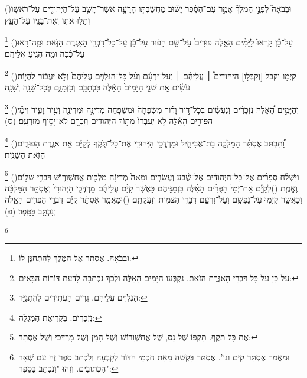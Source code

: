 \documentclass[12pt, openany]{book}
\newcommand{\footnotecomment}[1]{
	\renewcommand\thefootnote{}
	\footnote{#1}}
\newcommand{\commenta}[1]{\footnotecomment{#1}\hspace{0em}}
\newcommand{\vsnum}[1]{(\hebrewnumeral{#1})\space}
\begin{document}
{\vsnum{25}וּבְבֹאָהּ֮ לִפְנֵ֣י הַמֶּלֶךְ֒ אָמַ֣ר עִם־הַסֵּ֔פֶר יָשׁ֞וּב מַחֲשַׁבְתּ֧וֹ הָרָעָ֛ה אֲשֶׁר־חָשַׁ֥ב עַל־הַיְּהוּדִ֖ים עַל־רֹאשׁ֑וֹ וְתָל֥וּ אֹת֛וֹ וְאֶת־בָּנָ֖יו עַל־הָעֵֽץ׃%
\commenta{וּבְבֹאָהּ. אֶסְתֵּר אֶל הַמֶּלֶךְ לְהִתְחַנֶּן לוֹ:}%
\vsnum{26}עַל־כֵּ֡ן קָֽרְאוּ֩ לַיָּמִ֨ים הָאֵ֤לֶּה פוּרִים֙ עַל־שֵׁ֣ם הַפּ֔וּר עַל־כֵּ֕ן עַל־כָּל־דִּבְרֵ֖י הָאִגֶּ֣רֶת הַזֹּ֑את וּמָֽה־רָא֣וּ עַל־כָּ֔כָה וּמָ֥ה הִגִּ֖יעַ אֲלֵיהֶֽם׃%
\commenta{עַל כֵּן עַל כָּל דִּבְרֵי הָאִגֶּרֶת הַזֹּאת. נִקְבְּעוּ הַיָּמִים הָאֵלֶּה וּלְכַךְ נִכְתְּבָה לָדַעַת דּוֹרוֹת הַבָּאִים:}%
\vsnum{27}קִיְּמ֣וּ וקבל [וְקִבְּל֣וּ] הַיְּהוּדִים֩ ׀ עֲלֵיהֶ֨ם ׀ וְעַל־זַרְעָ֜ם וְעַ֨ל כָּל־הַנִּלְוִ֤ים עֲלֵיהֶם֙ וְלֹ֣א יַעֲב֔וֹר לִהְי֣וֹת עֹשִׂ֗ים אֵ֣ת שְׁנֵ֤י הַיָּמִים֙ הָאֵ֔לֶּה כִּכְתָבָ֖ם וְכִזְמַנָּ֑ם בְּכָל־שָׁנָ֖ה וְשָׁנָֽה׃%
\commenta{הַנִּלְוִים עֲלֵיהֶם. גֵּרִים הָעֲתִידִים לְהִתְגַּיֵּר:}%
\vsnum{28}וְהַיָּמִ֣ים הָ֠אֵלֶּה נִזְכָּרִ֨ים וְנַעֲשִׂ֜ים בְּכָל־דּ֣וֹר וָד֗וֹר מִשְׁפָּחָה֙ וּמִשְׁפָּחָ֔ה מְדִינָ֥ה וּמְדִינָ֖ה וְעִ֣יר וָעִ֑יר וִימֵ֞י הַפּוּרִ֣ים הָאֵ֗לֶּה לֹ֤א יַֽעַבְרוּ֙ מִתּ֣וֹךְ הַיְּהוּדִ֔ים וְזִכְרָ֖ם לֹא־יָס֥וּף מִזַּרְעָֽם׃ (ס)%
\commenta{נִזְכָּרִים. בִּקְרִיאַת הַמְּגִלָּה:}%
\vsnum{29}וַ֠תִּכְתֹּב אֶסְתֵּ֨ר הַמַּלְכָּ֧ה בַת־אֲבִיחַ֛יִל וּמָרְדֳּכַ֥י הַיְּהוּדִ֖י אֶת־כָּל־תֹּ֑קֶף לְקַיֵּ֗ם אֵ֣ת אִגֶּ֧רֶת הַפּוּרִ֛ים הַזֹּ֖את הַשֵּׁנִֽית׃%
\commenta{אֶת כָּל תּקֶף. תָּקְפּוֹ שֶׁל נֵס, שֶׁל אֲחַשְׁוֵרוֹשׁ וְשֶׁל הָמָן וְשֶׁל מָרְדְּכַי וְשֶׁל אֶסְתֵּר: }%
\vsnum{30}וַיִּשְׁלַ֨ח סְפָרִ֜ים אֶל־כָּל־הַיְּהוּדִ֗ים אֶל־שֶׁ֨בַע וְעֶשְׂרִ֤ים וּמֵאָה֙ מְדִינָ֔ה מַלְכ֖וּת אֲחַשְׁוֵר֑וֹשׁ דִּבְרֵ֥י שָׁל֖וֹם וֶאֱמֶֽת׃
\vsnum{31}לְקַיֵּ֡ם אֵת־יְמֵי֩ הַפֻּרִ֨ים הָאֵ֜לֶּה בִּזְמַנֵּיהֶ֗ם כַּאֲשֶׁר֩ קִיַּ֨ם עֲלֵיהֶ֜ם מָרְדֳּכַ֤י הַיְּהוּדִי֙ וְאֶסְתֵּ֣ר הַמַּלְכָּ֔ה וְכַאֲשֶׁ֛ר קִיְּמ֥וּ עַל־נַפְשָׁ֖ם וְעַל־זַרְעָ֑ם דִּבְרֵ֥י הַצֹּמ֖וֹת וְזַעֲקָתָֽם׃
\vsnum{32}וּמַאֲמַ֣ר אֶסְתֵּ֔ר קִיַּ֕ם דִּבְרֵ֥י הַפֻּרִ֖ים הָאֵ֑לֶּה וְנִכְתָּ֖ב בַּסֵּֽפֶר׃ (פ)%
\commenta{וּמַאֲמַר אֶסְתֵּר קִיַּם וגו'. אֶסְתֵּר בִּקְשָׁה מֵאֵת חַכְמֵי הַדּוֹר לְקָבְעָהּ וְלִכְתּב סֵפֶר זֶה עִם שְׁאָר הַכְּתוּבִים. וְזֶהוּ "וְנִכְתָּב בַּסֵּפֶר": }%
\clearpage}
\end{document}
